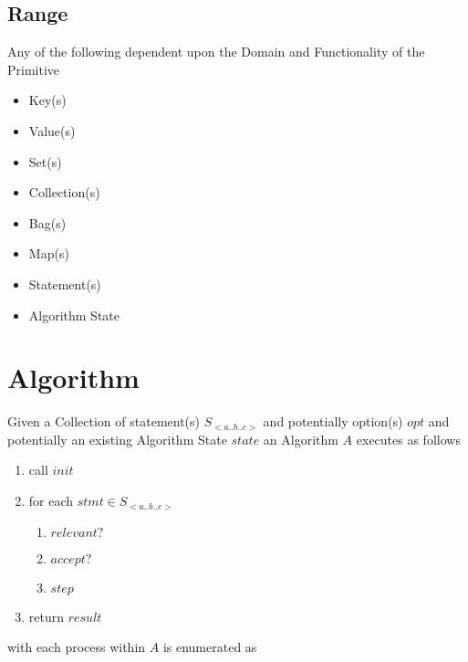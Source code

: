 \documentclass[../main.tex]{subfiles}
\begin{document}
\subsection{Range}
Any of the following dependent upon the Domain and Functionality of the Primitive

\begin{itemize}
\item Key(s)
\item Value(s)
\item Set(s)
\item Collection(s)
\item Bag(s)
\item Map(s)
\item Statement(s)
\item Algorithm State
\end{itemize}

\section{Algorithm}
Given a Collection of statement(s) $S_{<a..b..c>}$ and potentially option(s) $opt$ and potentially an existing Algorithm State $state$ an Algorithm $A$ executes as follows

\begin{enumerate}
\item call $init$
\item for each $stmt \in S_{<a..b..c>}$
  \begin{enumerate}
  \item $relevant?$
  \item $accept?$
  \item $step$
  \end{enumerate}
\item return $result$
\end{enumerate}
with each process within $A$ is enumerated as
\end{document}
